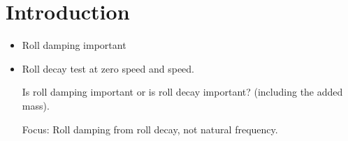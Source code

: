 \section{Introduction}
\label{se:introduction}

\begin{itemize}
    \item Roll damping important
    \item Roll decay test at zero speed and speed.
    
    Is roll damping important or is roll decay important? (including the added mass).
    
    Focus: Roll damping from roll decay, not natural frequency.
    
    
\end{itemize}
			
